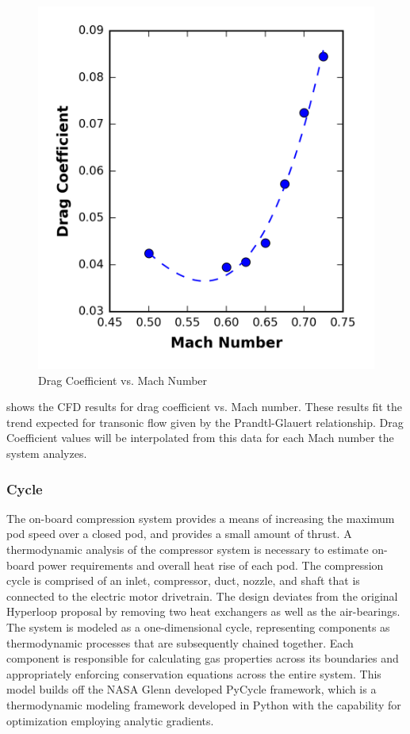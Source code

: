 	\begin{figure}
		\centering
		\includegraphics{../../images/graphs/cd_vs_mach/cd_vs_mach.png}
		\caption{Drag Coefficient vs. Mach Number}
		\label{fig:cd_vs_mach}
	\end{figure}
	 shows the CFD results for drag coefficient vs. Mach number.
	These results fit the trend expected for transonic flow given by the
	Prandtl-Glauert relationship. Drag Coefficient values will be interpolated
	from this data for each Mach number the system analyzes.
\subsubsection{Cycle}
	The on-board compression system provides a means of increasing the maximum
	pod speed over a closed pod,  and provides a small amount of thrust.
	A thermodynamic analysis of the compressor system is necessary to estimate
	on-board power requirements and overall heat rise of each pod.
	The compression cycle is comprised of an inlet, compressor, duct, nozzle,
	and shaft that is connected to the electric motor drivetrain. The design
	deviates from the original Hyperloop proposal by removing two heat
	exchangers as well as the air-bearings. The system is modeled as a
	one-dimensional cycle, representing components as thermodynamic processes
	that are subsequently chained together. Each component is responsible for
	calculating gas properties across its boundaries and appropriately enforcing
	conservation equations across the entire system. This model builds off the
	NASA Glenn developed PyCycle framework, which is a thermodynamic modeling
	framework developed in Python with the capability for optimization
	employing analytic gradients. \cite{PyCycle}
